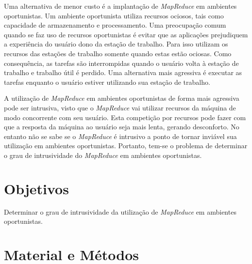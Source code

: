 \documentclass[a4paper,10pt]{article}
\begin{document}
Uma alternativa de menor custo é a implantação de \textit{MapReduce} em
ambientes oportunistas\cite{Lin:2010:MMO:1851476.1851489}. Um ambiente
oportunista utiliza recursos ociosos, tais como capacidade de armazenamento e
processamento.
Uma preocupação comum quando se faz uso de recursos oportunistas é evitar que 
as aplicações prejudiquem a experiência do usuário dono da estação de trabalho.
Para isso utilizam os recursos das estações de trabalho somente quando estas
estão ociosas. Como consequência, as tarefas são interrompidas quando o usuário
volta à estação de trabalho e trabalho útil é perdido.
Uma alternativa mais agressiva é executar as tarefas enquanto o usuário estiver
utilizando sua estação de trabalho\cite{W.Strickland:2005:GAT:1078027.1078527}.

A utilização de \textit{MapReduce} em ambientes oportunistas de forma mais
agressiva pode ser intrusiva, visto que o \textit{MapReduce} vai utilizar
recursos da máquina de modo concorrente com seu usuário. Esta competição por
recursos pode fazer com que a resposta da máquina ao usuário seja mais lenta,
gerando desconforto. No entanto não se sabe se o \textit{MapReduce} é intrusivo
a ponto de tornar inviável sua utilização em ambientes oportunistas. Portanto,
tem-se o problema de determinar o grau de intrusividade do \textit{MapReduce} em
ambientes oportunistas.

\section{Objetivos}

Determinar o grau de intrusividade da utilização de \textit{MapReduce} em
ambientes oportunistas.

\section{Material e Métodos}
\end{document}
